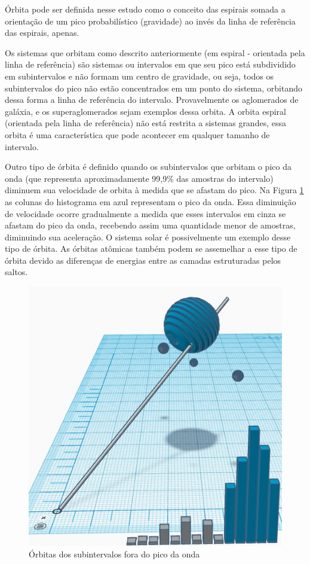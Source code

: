 Órbita pode ser definida nesse estudo como o conceito das espirais somada a orientação de um pico probabilístico (gravidade) ao invés da linha de referência das espirais, apenas.

Os sistemas que orbitam como descrito anteriormente (em espiral - orientada pela linha de referência) são sistemas ou intervalos em que seu pico está subdividido em subintervalos e não formam um centro de gravidade, ou seja, todos os subintervalos do pico não estão concentrados em um ponto do sistema, orbitando dessa forma a linha de referência do intervalo. Provavelmente os aglomerados de galáxia, e os superaglomerados sejam exemplos dessa orbita. A orbita espiral (orientada pela linha de referência) não está restrita a sistemas grandes, essa orbita é uma característica que pode acontecer em qualquer tamanho de intervalo.

Outro tipo de órbita é definido quando os subintervalos que orbitam o pico da onda (que representa aproximadamente 99,9\% das amostras do intervalo) diminuem sua velocidade de orbita à medida que se afastam do pico. Na Figura \ref{fig:consciousness_elliptical_orbit_system} as colunas do histograma em azul representam o pico da onda. Essa diminuição de velocidade ocorre gradualmente a medida que esses intervalos em cinza se afastam do pico da onda, recebendo assim uma quantidade menor de amostras, diminuindo sua aceleração. O sistema solar é possivelmente um exemplo desse tipo de órbita. As órbitas atômicas também podem se assemelhar a esse tipo de órbita devido as diferenças de energias entre as camadas estruturadas pelos saltos.  
	\begin{figure}[H]
	\caption{Órbitas dos subintervalos fora do pico da onda}
	\label{fig:consciousness_elliptical_orbit_system}
	\centering
	\includegraphics[scale=.7]{sections/images/consciousness_elliptical_orbit_system.jpg}
	\end{figure}

